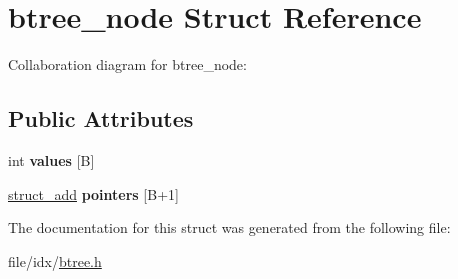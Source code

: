 \hypertarget{structbtree__node}{\section{btree\+\_\+node Struct Reference}
\label{structbtree__node}
}


Collaboration diagram for btree\+\_\+node\+:
\subsection*{Public Attributes}
\begin{DoxyCompactItemize}
\item 
\hypertarget{structbtree__node_a61819a9f2241e41b96a2eceeccbc9d2e}{int {\bfseries values} \mbox{[}B\mbox{]}}\label{structbtree__node_a61819a9f2241e41b96a2eceeccbc9d2e}

\item 
\hypertarget{structbtree__node_ad339f2c6b4a564e947cf5cb0d5d44b51}{\hyperlink{structstruct__add}{struct\+\_\+add} {\bfseries pointers} \mbox{[}B+1\mbox{]}}\label{structbtree__node_ad339f2c6b4a564e947cf5cb0d5d44b51}

\end{DoxyCompactItemize}


The documentation for this struct was generated from the following file\+:\begin{DoxyCompactItemize}
\item 
file/idx/\hyperlink{btree_8h}{btree.\+h}\end{DoxyCompactItemize}
